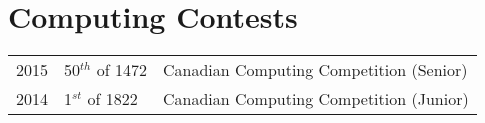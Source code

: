 \documentclass[]{deedy-resume-openfont}
\begin{document}
\begin{minipage}[t]{0.66\textwidth}




\section{Computing Contests} 
\begin{tabular}{rll}
2015	     & 50$^{th}$ of 1472 & Canadian Computing Competition (Senior)\\
2014	     & 1$^{st}$ of 1822  & Canadian Computing Competition (Junior)\\

\end{tabular}
\sectionsep

\sectionsep


\end{minipage}
\end{document}
